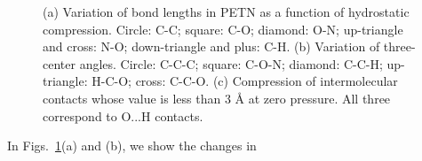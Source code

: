 \documentclass[prb,aps,nobibnotes,twocolumn,doublespace,twocolumngrid,superbib]{revtex4}
\begin{document}
\begin{figure}
\caption{(a) Variation of bond lengths in PETN as a function of hydrostatic 
compression.  Circle: C-C; square: C-O; diamond: O-N; up-triangle and
cross: N-O; down-triangle and plus: C-H.  (b) Variation of
three-center angles. Circle: C-C-C; square: C-O-N; diamond: C-C-H;
up-triangle: H-C-O; cross: C-C-O. (c) Compression of intermolecular
contacts whose value is less than 3 \AA\/ at zero pressure.  All three
correspond to O...H contacts.}
\label{fig:intramolecular}
\end{figure}
In Figs.~\ref{fig:intramolecular}(a) and (b), we show the changes in
\end{document}
